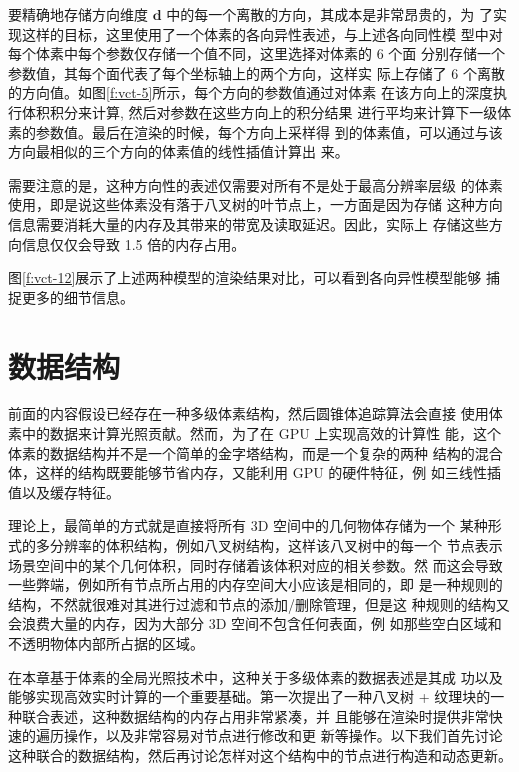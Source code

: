 要精确地存储方向维度 $\mathbf{d}$ 中的每一个离散的方向，其成本是非常昂贵的，为 了实现这样的目标，这里使用了一个体素的各向异性表述，与上述各向同性模 型中对每个体素中每个参数仅存储一个值不同，这里选择对体素的 6 个面 分别存储一个参数值，其每个面代表了每个坐标轴上的两个方向，这样实 际上存储了 6 个离散的方向值。如图\ref{f:vct-5}所示，每个方向的参数值通过对体素 在该方向上的深度执行体积积分来计算, 然后对参数在这些方向上的积分结果 进行平均来计算下一级体素的参数值。最后在渲染的时候，每个方向上采样得 到的体素值，可以通过与该方向最相似的三个方向的体素值的线性插值计算出 来。

需要注意的是，这种方向性的表述仅需要对所有不是处于最高分辨率层级 的体素使用，即是说这些体素没有落于八叉树的叶节点上，一方面是因为存储 这种方向信息需要消耗大量的内存及其带来的带宽及读取延迟。因此，实际上 存储这些方向信息仅仅会导致 1.5 倍的内存占用。

图\ref{f:vct-12}展示了上述两种模型的渲染结果对比，可以看到各向异性模型能够 捕捉更多的细节信息。




\section{数据结构}\label{sec:vct-data-structure}
前面的内容假设已经存在一种多级体素结构，然后圆锥体追踪算法会直接 使用体素中的数据来计算光照贡献。然而，为了在 GPU 上实现高效的计算性 能，这个体素的数据结构并不是一个简单的金字塔结构，而是一个复杂的两种 结构的混合体，这样的结构既要能够节省内存，又能利用 GPU 的硬件特征，例 如三线性插值以及缓存特征。

理论上，最简单的方式就是直接将所有 3D 空间中的几何物体存储为一个 某种形式的多分辨率的体积结构，例如八叉树结构，这样该八叉树中的每一个 节点表示场景空间中的某个几何体积，同时存储着该体积对应的相关参数。然 而这会导致一些弊端，例如所有节点所占用的内存空间大小应该是相同的，即 是一种规则的结构，不然就很难对其进行过滤和节点的添加/删除管理，但是这 种规则的结构又会浪费大量的内存，因为大部分 3D 空间不包含任何表面，例 如那些空白区域和不透明物体内部所占据的区域。

在本章基于体素的全局光照技术中，这种关于多级体素的数据表述是其成 功以及能够实现高效实时计算的一个重要基础。\cite{a:Gigavoxels:Avoxelbasedrenderingpipelineforefficientexplorationoflargeanddetailedscenes}第一次提出了一种八叉树 + 纹理块的一种联合表述，这种数据结构的内存占用非常紧凑，并 且能够在渲染时提供非常快速的遍历操作，以及非常容易对节点进行修改和更 新等操作。以下我们首先讨论这种联合的数据结构，然后再讨论怎样对这个结构中的节点进行构造和动态更新。



